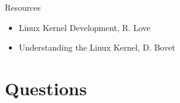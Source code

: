 \documentclass{workshop}
\begin{document}
\begin{frame}{Resources}
  \begin{itemize}
    \item Linux Kernel Development, R. Love
    \item Understanding the Linux Kernel, D. Bovet
  \end{itemize}
\end{frame}

\section{Questions}
\end{document}
